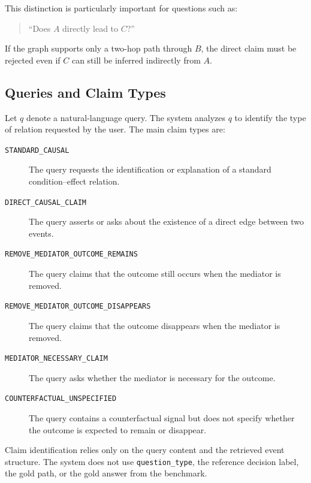 This distinction is particularly important for questions such as:

\begin{quote}
``Does \(A\) directly lead to \(C\)?''
\end{quote}

If the graph supports only a two-hop path through \(B\), the direct claim
must be rejected even if \(C\) can still be inferred indirectly from \(A\).

\subsection{Queries and Claim Types}

Let \(q\) denote a natural-language query. The system analyzes \(q\) to
identify the type of relation requested by the user. The main claim types
are:

\begin{description}
    \item[\texttt{STANDARD\_CAUSAL}] The query requests the identification or
    explanation of a standard condition--effect relation.

    \item[\texttt{DIRECT\_CAUSAL\_CLAIM}] The query asserts or asks about the
    existence of a direct edge between two events.

    \item[\texttt{REMOVE\_MEDIATOR\_OUTCOME\_REMAINS}] The query claims that
    the outcome still occurs when the mediator is removed.

    \item[\texttt{REMOVE\_MEDIATOR\_OUTCOME\_DISAPPEARS}] The query claims
    that the outcome disappears when the mediator is removed.

    \item[\texttt{MEDIATOR\_NECESSARY\_CLAIM}] The query asks whether the
    mediator is necessary for the outcome.

    \item[\texttt{COUNTERFACTUAL\_UNSPECIFIED}] The query contains a
    counterfactual signal but does not specify whether the outcome is
    expected to remain or disappear.
\end{description}

Claim identification relies only on the query content and the retrieved
event structure. The system does not use \texttt{question\_type}, the
reference decision label, the gold path, or the gold answer from the
benchmark.

